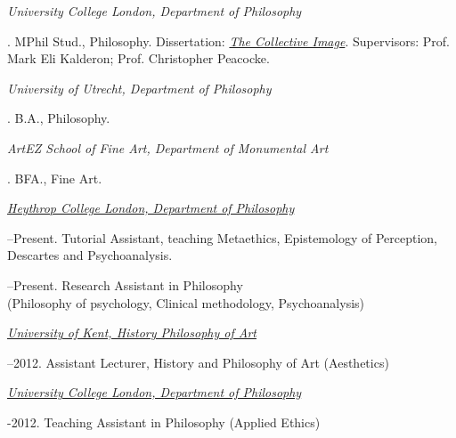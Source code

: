 \documentclass[11pt]{article}
\begin{document}
\noindent\emph{University College London, Department of  Philosophy \vspace{0.01in}}


. MPhil Stud., Philosophy. Dissertation: \href{http://discovery.ucl.ac.uk/1348204/}{\emph{The Collective Image}}. Supervisors: Prof. Mark Eli Kalderon; Prof. Christopher Peacocke. \vspace{-0.1in}

\bigskip

\noindent\emph{University of Utrecht, Department of  Philosophy\vspace{0.02in}}

. B.A., Philosophy.

\medskip

\noindent\emph{ArtEZ School of Fine Art, Department of Monumental Art\vspace{0.02in}}

. BFA., Fine Art.

\bigskip

\bigskip


\noindent\href{http://www.heythrop.ac.uk/departments/academic-departments/philosophy/}{\emph{Heythrop College London, Department of  Philosophy} \vspace{0.01in}}

--Present. Tutorial Assistant, teaching Metaethics, Epistemology of Perception, Descartes and Psychoanalysis.

--Present. Research Assistant in Philosophy\\ (Philosophy of psychology, Clinical methodology, Psychoanalysis)

\medskip

\noindent\href{http://www.kent.ac.uk/arts/hpa/index.html}{\emph{University of Kent, History \amper Philosophy of Art} \vspace{0.01in}}

--2012. Assistant Lecturer, History and Philosophy of Art (Aesthetics)

\medskip

\noindent\href{http://www.ucl.ac.uk/philosophy/}{\emph{University College London, Department of  Philosophy}} \vspace{0.01in}

-2012. Teaching Assistant in Philosophy (Applied Ethics)
\end{document}
